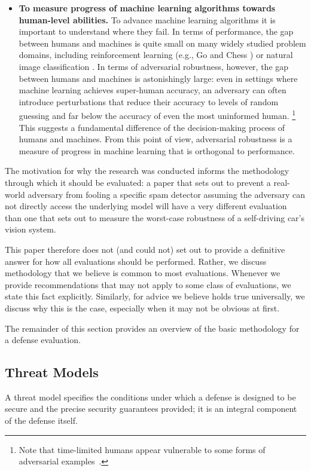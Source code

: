 \documentclass{article} %
\begin{document}
\begin{itemize}
\item \textbf{To measure progress of machine learning algorithms
  towards human-level abilities.}
  To advance machine learning algorithms it is important to understand where they fail.
  In terms of performance,
  the gap between humans and machines is quite small on many widely
  studied problem domains, including reinforcement
  learning (e.g., Go and Chess \citep{silver2016mastering})
  or natural image classification \citep{krizhevsky2012imagenet}.
  In terms of adversarial robustness, however, the gap
  between humans and machines is astonishingly large: even in
  settings where machine learning achieves
  super-human accuracy, an adversary can often introduce perturbations that
  reduce their accuracy to levels of random guessing and far below the
  accuracy of even the most uninformed human.%
  \footnote{Note that time-limited humans appear
    vulnerable to some forms of adversarial examples~\citep{elsayed2018adversarial}.}
  This suggests a fundamental difference of the
  decision-making process of humans and machines.
  From this point of
  view, adversarial robustness is a measure of progress in machine
  learning that is orthogonal to performance.

\end{itemize}

The motivation for why the research was conducted informs the
methodology through which it should be evaluated:
a paper that sets out to prevent a real-world adversary from fooling a
specific spam detector assuming the adversary can not directly access
the underlying model will have a very different evaluation than one that
sets out to measure the worst-case robustness of a self-driving car's vision system.

This paper therefore does not (and could not) set out to provide a definitive
answer for how all evaluations should be performed.
%
Rather, we discuss methodology that we believe is common to most evaluations.
%
Whenever we provide recommendations that may not apply to some class of
evaluations, we state this fact explicitly.
%
Similarly, for
advice we believe holds true universally, we discuss why this is the case,
especially when it may not be obvious at first.

The remainder of this section provides an overview of the basic methodology
for a defense evaluation.


\subsection{Threat Models}
\label{sec:threatmodel}
A threat model specifies the conditions under which a defense
is designed to be secure and the precise security guarantees provided;
it is an integral component of the defense itself.
\end{document}
